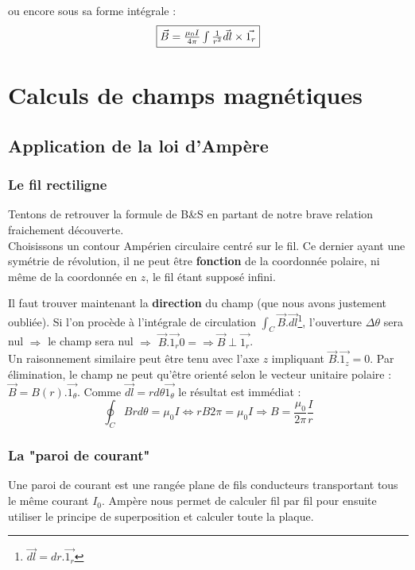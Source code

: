 \documentclass	[11pt, a4paper, openany]{book}
\begin{document}
ou encore sous sa forme intégrale :
\begin{equation}
\fbox{$\vec{B} = \frac{\mu_0 I}{4\pi} \int \frac{1}{r^2}\vec{dl} \times \vec{1_r}$}
\end{equation}


\section{Calculs de champs magnétiques}
\subsection{Application de la loi d'Ampère}
\subsubsection{Le fil rectiligne}
Tentons de retrouver la formule de B\&S en partant de notre brave relation fraichement découverte.\\

Choisissons un contour Ampérien circulaire centré sur le fil. Ce dernier ayant une symétrie de révolution, il ne peut être \textbf{fonction} de la coordonnée polaire, ni même de la coordonnée en $z$, le fil étant supposé infini.


Il faut trouver maintenant la \textbf{direction} du champ (que nous avons justement oubliée). Si l'on procède à l'intégrale de circulation $\int_C \vec{B}.\vec{dl}$\footnote{$\vec{dl} = dr.\vec{1_r}$}, l'ouverture $\Delta\theta$ sera nul $\Rightarrow$ le champ sera nul $\Rightarrow$ $\vec{B}.\vec{1_r} 0 = \Rightarrow \vec{B} \perp \vec{1_r}$.\\


Un raisonnement similaire peut être tenu avec l'axe $z$ impliquant $\vec{B}.\vec{1_z} = 0$. Par élimination, le champ ne peut qu'être orienté selon le vecteur unitaire polaire : $\vec{B} = B(r).\vec{1_\theta}$. Comme $\vec{dl} = rd\theta\vec{1_\theta}$ le résultat est immédiat :
\begin{equation}
\oint_C Brd\theta = \mu_0 I \Leftrightarrow rB2\pi = \mu_0 I \Rightarrow B = \frac{\mu_0}{2\pi}\frac{I}{r}
\end{equation}



\subsubsection{La "paroi de courant"}
Une paroi de courant est une rangée plane de fils conducteurs transportant tous le même courant $I_0$. Ampère nous permet de calculer fil par fil pour ensuite utiliser le principe de superposition et calculer toute la plaque.
\end{document}
